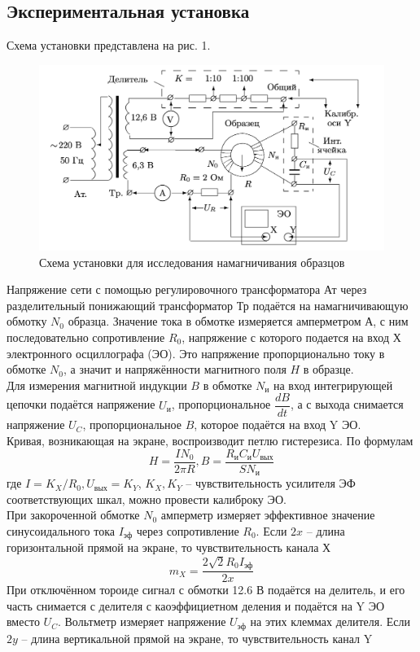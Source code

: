 \documentclass[12pt,a4paper]{article}
\begin{document}
\subsection*{Экспериментальная установка}
Схема установки представлена на рис. 1. 
\begin{figure}
    \centering
    \includegraphics*[width=0.8\linewidth]{pics/scheme.png}
    \caption{Схема установки для исследования намагничивания образцов}
\end{figure}
Напряжение сети с помощью регулировочного трансформатора Ат через разделительный понижающий трансформатор Тр подаётся на намагничивающую обмотку $N_0$ образца. 
Значение тока в обмотке измеряется амперметром А, с ним последовательно сопротивление $R_0$, напряжение с которого подается на вход Х электронного осциллографа (ЭО). 
Это напряжение пропорционально току в обмотке $N_0$, а значит и напряжённости магнитного поля $H$ в образце.\\
Для измерения магнитной индукции $B$ в обмотке $N_\text{и}$ на вход интегрирующей цепочки подаётся напряжение $U_\text{и}$, пропорциональное $\dfrac{dB}{dt}$, а с выхода снимается напряжение $U_C$, пропорциональное $B$, которое подаётся на вход Y ЭО.\\
Кривая, возникающая на экране, воспроизводит петлю гистерезиса. 
По формулам 
\[
H = \dfrac{IN_0}{2\pi R}, B = \dfrac{R_\text{и} C_\text{и}U_\text{вых}}{SN_\text{и}}
\]
где $I = K_X/R_0, U_\text{вых} = K_Y$, $K_X, K_Y$ -- чувствительность усилителя ЭФ соответствующих шкал, можно провести калиброку ЭО.\\
При закороченной обмотке $N_0$ амперметр измеряет эффективное значение синусоидального тока $I_\text{эф}$ через сопротивление $R_0$. Если $2x$ -- длина горизонтальной прямой на экране, то чувствительность канала Х
\begin{equation}
    m_X = \dfrac{2\sqrt{2}R_0I_\text{эф}}{2x}
\end{equation}
При отключённом тороиде сигнал с обмотки 12.6 В подаётся на делитель, и его часть снимается с делителя с каоэффициетном деления и подаётся на Y ЭО вместо $U_C$. Вольтметр измеряет напряжение $U_\text{эф}$ на этих клеммах делителя. Если $2y$ -- длина вертикальной прямой на экране, то чувствительность канал Y
\end{document}
